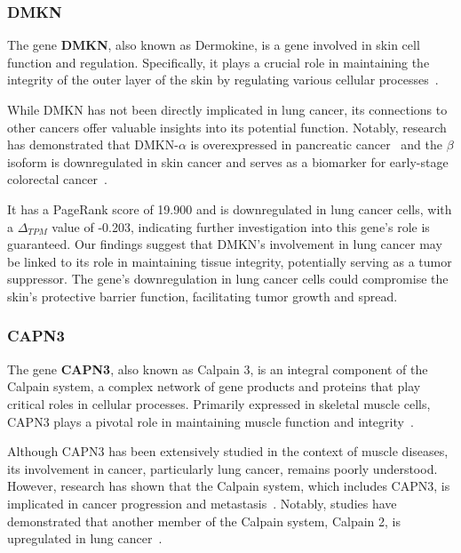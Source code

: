 \subsubsection*{DMKN} \label{subsubsec:dmkn}
The gene \textbf{DMKN}, also known as Dermokine, is a gene involved in skin cell function and regulation.
Specifically, it plays a crucial role in maintaining the integrity of the outer layer of the skin
by regulating various cellular processes~\cite{Naso2007Deromokine}.

While DMKN has not been directly implicated in lung cancer, its connections to other cancers offer valuable insights into its potential function.
Notably, research has demonstrated that DMKN-$\alpha$ is overexpressed in pancreatic cancer~\cite{Zhang2022DMKN}
and the $\beta$ isoform is downregulated in skin cancer and serves as a biomarker for early-stage colorectal cancer~\cite{Hasegawa2012Dermokine}.

It has a PageRank score of 19.900 and is downregulated in lung cancer cells,
with a $\Delta_{TPM}$ value of -0.203, indicating further investigation into this gene's role is guaranteed.
Our findings suggest that DMKN's involvement in lung cancer may be linked to its role in maintaining tissue integrity,
potentially serving as a tumor suppressor.
The gene's downregulation in lung cancer cells could compromise the skin's protective barrier function, facilitating tumor growth and spread.
\newline

\subsubsection*{CAPN3} \label{subsubsec:capn3}
The gene \textbf{CAPN3}, also known as Calpain 3, is an integral component of the Calpain system,
a complex network of gene products and proteins that play critical roles in cellular processes.
Primarily expressed in skeletal muscle cells, CAPN3 plays a pivotal role in maintaining muscle function and integrity~\cite{Spinozzi2021Calpain}.

Although CAPN3 has been extensively studied in the context of muscle diseases,
its involvement in cancer, particularly lung cancer, remains poorly understood.
However, research has shown that the Calpain system, which includes CAPN3, is implicated in cancer progression and metastasis~\cite{Storr2011Calpain}.
Notably, studies have demonstrated that another member of the Calpain system, Calpain 2, is upregulated in lung cancer~\cite{Xu2019Calpain}.

